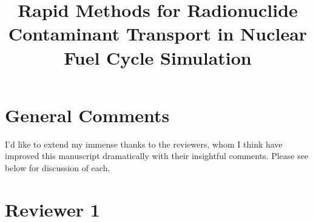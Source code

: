 \documentclass[answers,12pt]{exam}
\begin{document}



\title{Rapid Methods for Radionuclide Contaminant Transport in Nuclear Fuel Cycle Simulation}



%

\section*{General Comments}
I'd like to extend my immense thanks to the reviewers, whom I think have
improved this manuscript dramatically with their insightful comments. Please
see below for discussion of each.  

\section*{Reviewer 1}
\end{document}
